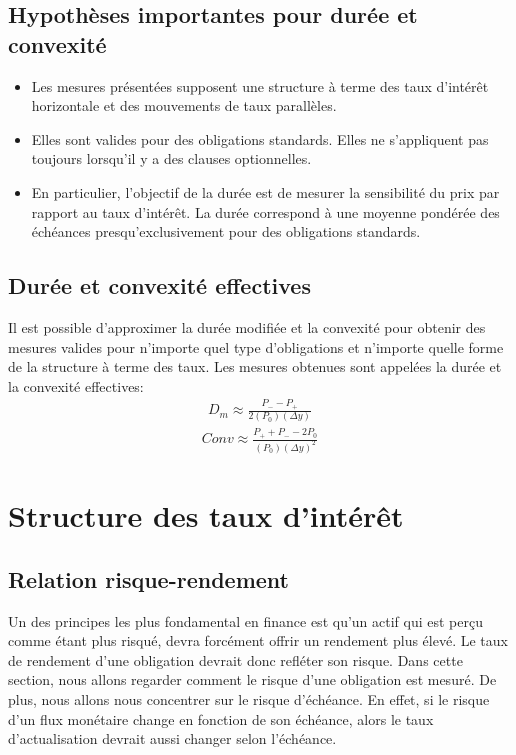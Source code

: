 \documentclass[12pt]{article}
\begin{document}
\section{Hypothèses importantes pour durée et convexité}
\begin{itemize}
\item Les mesures présentées supposent une structure à terme des taux d’intérêt horizontale et des mouvements de taux parallèles.
\item Elles sont valides pour des obligations standards. Elles ne s’appliquent pas toujours lorsqu’il y a des clauses optionnelles.
\item En particulier, l’objectif de la durée est de mesurer la sensibilité du prix par rapport au taux d’intérêt. La durée correspond à une moyenne pondérée des échéances presqu’exclusivement pour des obligations standards.
\end{itemize}
\section{Durée et convexité effectives}
Il est possible d’approximer la durée modifiée et la convexité pour obtenir des mesures valides pour n’importe quel type d’obligations et n’importe quelle forme de la structure à terme des taux. Les mesures obtenues sont appelées la durée et la convexité effectives:
\begin{align*}
D_m \approx \frac{P_{-}-P_{+}}{2(P_0)(\Delta y)}
\end{align*}
\begin{align*}
Conv\approx \frac{P_{+}+P_{-}-2P_0}{(P_0)(\Delta y)^2}
\end{align*}

\chapter{Structure des taux d’intérêt}

\section{Relation risque-rendement}
Un des principes les plus fondamental en finance est qu'un actif qui est perçu comme étant plus risqué,  devra forcément offrir un rendement plus élevé.  Le taux de rendement d’une obligation devrait donc refléter son risque.  Dans cette section, nous allons regarder comment le risque d'une obligation est mesuré.  De plus,  nous allons nous concentrer sur le risque d'échéance.  En effet,  si le risque d’un flux monétaire change en fonction de son échéance,  alors le taux d’actualisation devrait aussi changer selon l’échéance.
\end{document}
